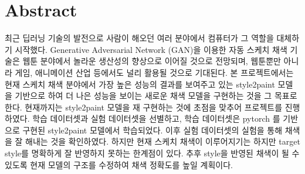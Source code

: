 \section{Abstract}

최근 딥러닝 기술의 발전으로 사람이 해오던 여러 분야에서 컴퓨터가 그 역할을 대체하기 시작했다. Generative Adversarial Network (GAN)을 이용한 자동 스케치 채색 기술은 웹툰 분야에서 놀라운 생산성의 향상으로 이어질 것으로 전망되며, 웹툰뿐만 아니라 게임, 애니메이션 산업 등에서도 널리 활용될 것으로 기대된다. 본 프로젝트에서는 현재 스케치 채색 분야에서 가장 높은 성능의 결과를 보여주고 있는 style2paint 모델을 기반으로 하여 더 나은 성능을 보이는 새로운 채색 모델을 구현하는 것을 그 목표로 한다. 현재까지는 style2paint 모델을 재 구현하는 것에 초점을 맞추어 프로젝트를 진행하였다. 
학습 데이터셋과 실험 데이터셋을 선별하고, 학습 데이터셋은 pytorch \cite{pytorch}를 기반으로 구현된 style2paint 모델에서 학습되었다. 이후 실험 데이터셋의 실험을 통해 채색을 잘 해내는 것을 확인하였다.
하지만 현재 스케치 채색이 이루어지기는 하지만 target style를 명확하게 잘 반영하지 못하는 한계점이 있다. 추후 style을 반영된 채색이 될 수 있도록 현재 모델의 구조를 수정하여 채색 정확도를 높일 계획이다.	